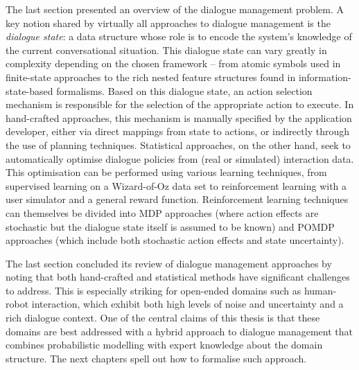The last section presented an overview of the dialogue management problem. A key notion shared by virtually all approaches to dialogue management is the \textit{dialogue state}: a data structure whose role is to encode the system's knowledge of the current conversational situation.  This dialogue state can vary greatly in complexity depending on the chosen framework -- from atomic symbols used in finite-state approaches to  the rich nested feature structures found in information-state-based formalisms. Based on this dialogue state, an action selection mechanism is responsible for the selection of the appropriate action to execute.  In hand-crafted approaches, this mechanism is manually specified by the application developer, either via direct mappings from state to actions, or indirectly through the use of planning techniques.  Statistical approaches, on the other hand, seek to automatically optimise dialogue policies from (real or simulated) interaction data.  This optimisation can be performed using various learning techniques, from supervised learning on a Wizard-of-Oz data set to reinforcement learning with a user simulator and a general reward function.   Reinforcement learning techniques can themselves be divided into MDP approaches (where action effects are stochastic but the dialogue state itself is assumed to be known) and POMDP approaches (which include both stochastic action effects and state uncertainty). 

The last section concluded its review of dialogue management approaches by noting that both hand-crafted and statistical methods have significant challenges to address.  This is especially striking for open-ended domains such as human-robot interaction, which exhibit both high levels of noise and uncertainty and a rich dialogue context.   One of the central claims of this thesis is that these domains are best addressed with a hybrid approach to dialogue management that combines probabilistic modelling with expert knowledge about the domain structure.  The next chapters spell out how to formalise such approach. 

